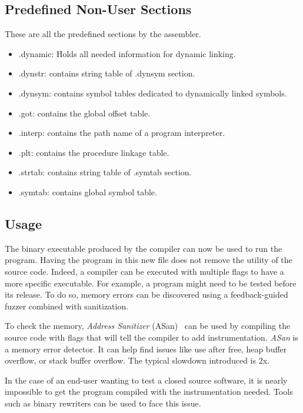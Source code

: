 \documentclass[a4paper,11pt,oneside]{report}
\begin{document}
\subsection{Predefined Non-User Sections}
These are all the predefined sections by the assembler.
\begin{itemize}
    \item    .dynamic: Holds all needed information for dynamic linking.
    \item    .dynstr: contains string table of .dynsym section.
    \item    .dynsym: contains symbol tables dedicated to dynamically linked
        symbols.
    \item    .got: contains the global offset table.
    \item    .interp: contains the path name of a program interpreter.
    \item    .plt: contains the procedure linkage table.
    \item    .strtab: contains string table of .symtab section.
    \item    .symtab: contains global symbol table.
\end{itemize}







\subsection{Usage}
The binary executable produced by the compiler can now be used to run the program.
Having the program in this new file does not remove the utility of the source code.
Indeed, a compiler can be executed with multiple flags to have a more 
specific executable. For example, a program might need to be tested before its
release. To do so, memory errors can be discovered using a feedback-guided fuzzer
combined with sanitization.


To check the memory, \textit{Address Sanitizer} (ASan)~\cite{ASan}
can be used by compiling the source code with flags that will tell the
compiler to add instrumentation. 
\textit{ASan} is a memory error detector. It can help find issues like use
after free, heap buffer overflow, or stack buffer overflow. The typical
slowdown introduced is 2x.


In the case of an end-user wanting to test a closed source software, it is
nearly impossible to get the program compiled with the instrumentation needed.
Tools such as binary rewriters can be used to face this issue.
\end{document}
